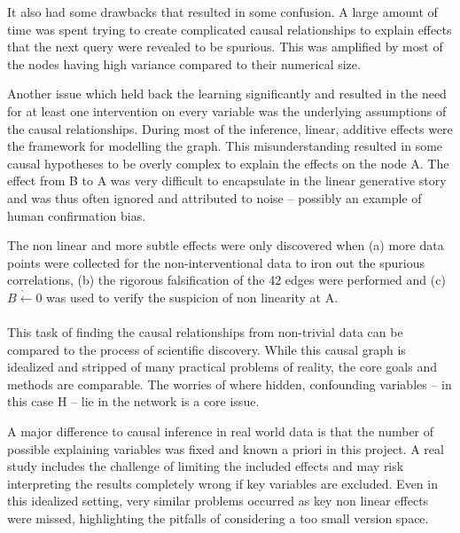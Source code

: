 \documentclass[12pt,fleqn,]{article}
\begin{document}
\begin{multicols}{2}
It also had some drawbacks that resulted in some confusion. A large amount of time was spent trying to create complicated causal relationships to explain effects that the next query were revealed to be spurious. This was amplified by most of the nodes having high variance compared to their numerical size.

Another issue which held back the learning significantly and resulted in the need for at least one intervention on every variable was the underlying assumptions of the causal relationships. During most of the inference, linear, additive effects were the framework for modelling the graph. This misunderstanding resulted in some causal hypotheses to be overly complex to explain the effects on the node A. The effect from B to A was very difficult to encapsulate in the linear generative story and was thus often ignored and attributed to noise -- possibly an example of human confirmation bias. 

The non linear and more subtle effects were only discovered when (a) more data points were collected for the non-interventional data to iron out the spurious correlations, (b) the rigorous falsification of the 42 edges were performed and (c) \(\mathring{B\leftarrow0}\) was used to verify the suspicion of non linearity at A.
\\
\\
This task of finding the causal relationships from non-trivial data can be compared to the process of scientific discovery. While this causal graph is idealized and stripped of many practical problems of reality, the core goals and methods are comparable. The worries of where hidden, confounding variables -- in this case H -- lie in the network is a core issue.

A major difference to causal inference in real world data is that the number of possible explaining variables was fixed and known a priori in this project. A real study includes the challenge of limiting the included effects and may risk interpreting the results completely wrong if key variables are excluded. Even in this idealized setting, very similar problems occurred as key non linear effects were missed, highlighting the pitfalls of considering a too small version space. %


\end{multicols}
\end{document}
